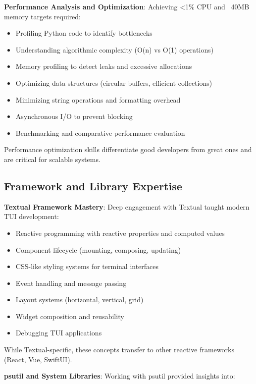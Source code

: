 \documentclass[12pt,a4paper,oneside]{report}
\begin{document}
\textbf{Performance Analysis and Optimization}: Achieving <1\% CPU and ~40MB memory targets required:

\begin{itemize}
    \item Profiling Python code to identify bottlenecks
    \item Understanding algorithmic complexity (O(n) vs O(1) operations)
    \item Memory profiling to detect leaks and excessive allocations
    \item Optimizing data structures (circular buffers, efficient collections)
    \item Minimizing string operations and formatting overhead
    \item Asynchronous I/O to prevent blocking
    \item Benchmarking and comparative performance evaluation
\end{itemize}

Performance optimization skills differentiate good developers from great ones and are critical for scalable systems.

\subsection{Framework and Library Expertise}

\textbf{Textual Framework Mastery}: Deep engagement with Textual taught modern TUI development:

\begin{itemize}
    \item Reactive programming with reactive properties and computed values
    \item Component lifecycle (mounting, composing, updating)
    \item CSS-like styling systems for terminal interfaces
    \item Event handling and message passing
    \item Layout systems (horizontal, vertical, grid)
    \item Widget composition and reusability
    \item Debugging TUI applications
\end{itemize}

While Textual-specific, these concepts transfer to other reactive frameworks (React, Vue, SwiftUI).

\textbf{psutil and System Libraries}: Working with psutil provided insights into:
\end{document}
